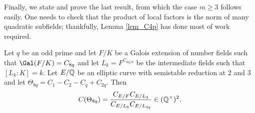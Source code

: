 Finally, we state and prove the last result, from which the case $m\geq3$ follows easily. One needs to check that the product of local factors is the norm of many quadratic subfields; thankfully, Lemma \ref{lem_C4p} has done most of work required.

\begin{lemma}\label{lem_C8p}
    Let $q$ be an odd prime and let $F/K$ be a Galois extension of number fields such that $\Gal(F/K)=C_{8q}$ and let $L_k=F^{C_{8q/k}}$ be the intermediate fields such that $[L_k:K]=k$. Let $E/\mathbb{Q}$ be an elliptic curve with semistable reduction at $2$ and $3$ and let $\Theta_{8q}=C_1-C_2-C_q+C_{2q}$. Then 
    $$C(\Theta_{8q})=\frac{C_{E/F}C_{E/L_4}}{C_{E/L_8}C_{E/L_{4q}}}\in(\mathbb{Q}^{\times})^2.$$
\end{lemma}

